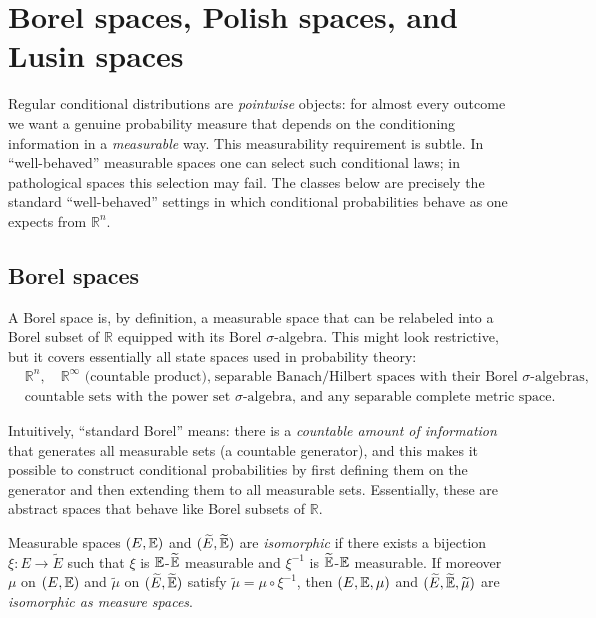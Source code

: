 \section{Borel spaces, Polish spaces, and Lusin spaces}

Regular conditional distributions are \emph{pointwise} objects: for almost every outcome
we want a genuine probability measure that depends on the conditioning information in a \emph{measurable} way.
This measurability requirement is subtle. In ``well-behaved'' measurable spaces one can select such conditional laws;
in pathological spaces this selection may fail. The classes below are precisely the standard ``well-behaved'' settings
in which conditional probabilities behave as one expects from $\mathbb{R}^n$.

\subsection*{Borel spaces}
A Borel space is, by definition, a measurable space that can be relabeled into a Borel subset of $\mathbb{R}$ equipped with its Borel $\sigma$-algebra.
This might look restrictive, but it covers essentially all state spaces used in probability theory:
\[
\begin{aligned}
&\mathbb{R}^n,\quad \mathbb{R}^\infty \text{ (countable product),}\;\text{separable Banach/Hilbert spaces with their Borel $\sigma$-algebras,}\\
&\text{countable sets with the power set $\sigma$-algebra, and any separable complete metric space.}
\end{aligned}
\]

Intuitively, ``standard Borel'' means: there is a \emph{countable amount of information} that generates all measurable sets
(a countable generator), and this makes it possible to construct conditional probabilities by first defining them on the generator
and then extending them to all measurable sets. Essentially, these are abstract spaces that behave like Borel subsets of $\mathbb{R}$.

\begin{definition}
\label{def:isom}
Measurable spaces $(E,\mathbb{E})$ and $(\widetilde E,\widetilde{\mathbb{E}})$ are \emph{isomorphic}
if there exists a bijection $\xi:E\to \widetilde E$ such that $\xi$ is $\mathbb{E}$-$\widetilde{\mathbb{E}}$ measurable and
$\xi^{-1}$ is $\widetilde{\mathbb{E}}$-$\mathbb{E}$ measurable.
If moreover $\mu$ on $(E,\mathbb{E})$ and $\widetilde\mu$ on $(\widetilde E,\widetilde{\mathbb{E}})$ satisfy
$\widetilde\mu=\mu\circ \xi^{-1}$, then $(E,\mathbb{E},\mu)$ and $(\widetilde E,\widetilde{\mathbb{E}},\widetilde\mu)$ are
\emph{isomorphic as measure spaces}.
\end{definition}

